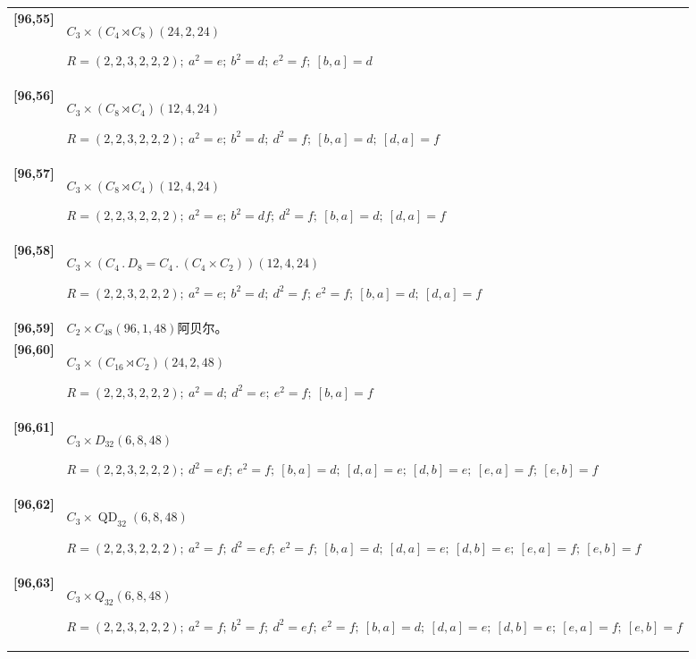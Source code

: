 \documentclass[UTF8,fontset=fandol,11pt,a4paper]{ctexart}
\begin{document}
\begin{longtable}{@{}p{17mm}>{\raggedright\arraybackslash}p{141mm}@{}}
\textbf{[96,55]} & $C_{3}\times (C_{4}\rtimes C_{8})$\quad $(24,2,24)$\par\(R=(2,2,3,2,2,2);\allowbreak\ a^{2}=e;\allowbreak\ b^{2}=d;\allowbreak\ e^{2}=f;\allowbreak\ [b,a]=d\)\\[3pt]

\textbf{[96,56]} & $C_{3}\times (C_{8}\rtimes C_{4})$\quad $(12,4,24)$\par\(R=(2,2,3,2,2,2);\allowbreak\ a^{2}=e;\allowbreak\ b^{2}=d;\allowbreak\ d^{2}=f;\allowbreak\ [b,a]=d;\allowbreak\ [d,a]=f\)\\[3pt]

\textbf{[96,57]} & $C_{3}\times (C_{8}\rtimes C_{4})$\quad $(12,4,24)$\par\(R=(2,2,3,2,2,2);\allowbreak\ a^{2}=e;\allowbreak\ b^{2}=df;\allowbreak\ d^{2}=f;\allowbreak\ [b,a]=d;\allowbreak\ [d,a]=f\)\\[3pt]

\textbf{[96,58]} & $C_{3}\times (C_{4}\mathbin{.} D_{8} = C_{4}\mathbin{.} (C_{4}\times C_{2}))$\quad $(12,4,24)$\par\(R=(2,2,3,2,2,2);\allowbreak\ a^{2}=e;\allowbreak\ b^{2}=d;\allowbreak\ d^{2}=f;\allowbreak\ e^{2}=f;\allowbreak\ [b,a]=d;\allowbreak\ [d,a]=f\)\\[3pt]

\textbf{[96,59]} & $C_{2}\times C_{48}$\quad $(96,1,48)$\quad 阿贝尔。\\[3pt]

\textbf{[96,60]} & $C_{3}\times (C_{16}\rtimes C_{2})$\quad $(24,2,48)$\par\(R=(2,2,3,2,2,2);\allowbreak\ a^{2}=d;\allowbreak\ d^{2}=e;\allowbreak\ e^{2}=f;\allowbreak\ [b,a]=f\)\\[3pt]

\textbf{[96,61]} & $C_{3}\times D_{32}$\quad $(6,8,48)$\par\(R=(2,2,3,2,2,2);\allowbreak\ d^{2}=ef;\allowbreak\ e^{2}=f;\allowbreak\ [b,a]=d;\allowbreak\ [d,a]=e;\allowbreak\ [d,b]=e;\allowbreak\ [e,a]=f;\allowbreak\ [e,b]=f\)\\[3pt]

\textbf{[96,62]} & $C_{3}\times \operatorname{QD}_{32}$\quad $(6,8,48)$\par\(R=(2,2,3,2,2,2);\allowbreak\ a^{2}=f;\allowbreak\ d^{2}=ef;\allowbreak\ e^{2}=f;\allowbreak\ [b,a]=d;\allowbreak\ [d,a]=e;\allowbreak\ [d,b]=e;\allowbreak\ [e,a]=f;\allowbreak\ [e,b]=f\)\\[3pt]

\textbf{[96,63]} & $C_{3}\times Q_{32}$\quad $(6,8,48)$\par\(R=(2,2,3,2,2,2);\allowbreak\ a^{2}=f;\allowbreak\ b^{2}=f;\allowbreak\ d^{2}=ef;\allowbreak\ e^{2}=f;\allowbreak\ [b,a]=d;\allowbreak\ [d,a]=e;\allowbreak\ [d,b]=e;\allowbreak\ [e,a]=f;\allowbreak\ [e,b]=f\)\\[3pt]


\end{longtable}
\end{document}
